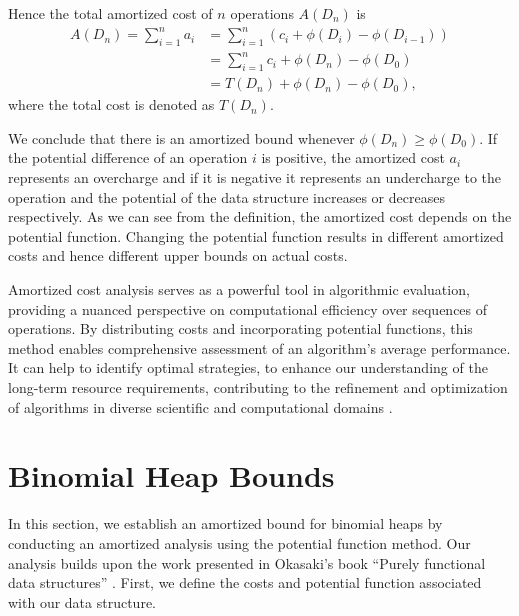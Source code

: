 \documentclass{clmthesis}
\begin{document}

Hence the total amortized cost of $n$ operations $A(D_n)$ is
\begin{align*}
A(D_n) = \sum_{i=1}^{n}a_i &= \sum_{i=1}^{n}(c_i + \phi(D_i) - \phi(D_{i-1})) \\
&= \sum_{i=1}^{n}c_i + \phi(D_n) - \phi(D_0) \\
&= T(D_n) + \phi(D_n) - \phi(D_0),
\end{align*}
where the total cost is denoted as $T(D_n)$.


We conclude that there is an amortized bound whenever $\phi(D_n) \geq \phi(D_0)$.
If the potential difference of an operation $i$ is positive, the amortized cost $a_i$ represents an overcharge and if it is negative it represents an undercharge to the operation and the potential of the data structure increases or decreases respectively.
As we can see from the definition, the amortized cost depends on the potential function. Changing the potential function results in different amortized costs and hence different upper bounds on actual costs.

Amortized cost analysis serves as a powerful tool in algorithmic evaluation, providing a nuanced perspective on computational efficiency over sequences of operations. By distributing costs and incorporating potential functions, this method enables comprehensive assessment of an algorithm's average performance. It can help to identify optimal strategies, to enhance our understanding of the long-term resource requirements, contributing to the refinement and optimization of algorithms in diverse scientific and computational domains \cite{tarjan1985amortized}.



\section{Binomial Heap Bounds}\label{amortized_bin1}
In this section, we establish an amortized bound for binomial heaps by conducting an amortized analysis using the potential function method. Our analysis builds upon the work presented in Okasaki's book \enquote{Purely functional data structures} \cite{okasaki1999}. First, we define the costs and potential function associated with our data structure.
\end{document}
